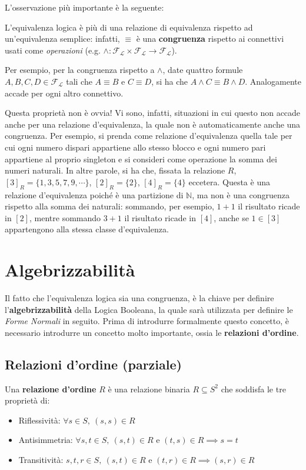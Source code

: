 L'osservazione più importante è la seguente: 
\begin{oss}
L'equivalenza logica è più di una relazione di equivalenza rispetto ad un'equivalenza semplice: infatti, $\equiv$ è una \textbf{congruenza} rispetto ai connettivi usati come \textit{operazioni} (e.g. $\land: \mathscr{F_L} \times \mathscr{F_L} \rightarrow \mathscr{F_L}$).
\end{oss}
Per esempio, per la congruenza rispetto a $\land$, date quattro formule $A, B, C, D \in \mathscr{F_L}$ tali che $A \equiv B$ e $C \equiv D$, si ha che $A \land C \equiv B \land D$. Analogamente accade per ogni altro connettivo.

Questa proprietà non è ovvia! Vi sono, infatti, situazioni in cui questo non accade anche per una relazione d'equivalenza, la quale non è automaticamente anche una congruenza. Per esempio,  si prenda come relazione d'equivalenza quella tale per cui ogni numero dispari appartiene allo stesso blocco e ogni numero pari appartiene al proprio singleton e si consideri come operazione la somma dei numeri naturali. In altre parole, si ha che, fissata la relazione $R$, $[3]_R = \{1, 3, 5, 7, 9, \cdots\}$, $[2]_R = \{2\}$, $[4]_R = \{4\}$ eccetera. 
Questa è una relazione d'equivalenza poiché è una partizione di $\mathbb{N}$, 
ma non è una congruenza rispetto alla somma dei naturali: sommando, per esempio, 
$1+1$ il risultato ricade in $[2]$, mentre sommando $3+1$ il risultato 
ricade in $[4]$, anche se $1 \in [3]$ appartengono alla stessa classe d'equivalenza. 

\section{Algebrizzabilità}
Il fatto che l'equivalenza logica sia una congruenza, è la chiave per definire l'\textbf{algebrizzabilità} della Logica Booleana, la quale sarà utilizzata per definire le \textit{Forme Normali} in seguito. 
Prima di introdurre formalmente questo concetto, è necessario introdurre un concetto molto importante, ossia le \textbf{relazioni d'ordine}.  

\subsection{Relazioni d'ordine (parziale)}
\begin{defi}
\label{def:poset}
  Una \textbf{relazione d'ordine} $R$ è una relazione binaria $R \subseteq S^2$ che soddisfa le tre proprietà di: 
\begin{itemize}
  \item Riflessività: $\forall s \in S,\ (s,s) \in R$
  \item Antisimmetria: $\forall s, t \in S,\ (s,t)\in R$ e $(t,s) \in R \implies s = t$
  \item Transitività: $s,t,r \in S,\ (s,t) \in R$ e $(t,r) \in R \implies (s,r) \in R$
\end{itemize}
\end{defi}


